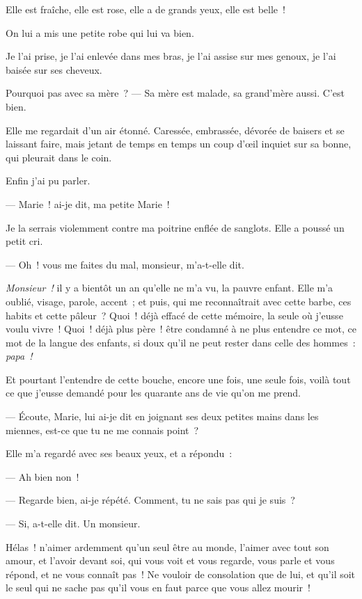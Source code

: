 \documentclass[french,twoside]{book} %
\begin{document}
\noindent Elle est fraîche, elle est rose, elle a de grands yeux, elle est belle !\par
On lui a mis une petite robe qui lui va bien.\par
Je l’ai prise, je l’ai enlevée dans mes bras, je l’ai assise sur mes genoux, je l’ai baisée sur ses cheveux.\par
Pourquoi pas avec sa mère ? — Sa mère est malade, sa grand’mère aussi. C’est bien.\par
Elle me regardait d’un air étonné. Caressée, embrassée, dévorée de baisers et se laissant faire, mais jetant de temps en temps un coup d’œil inquiet sur sa bonne, qui pleurait dans le coin.\par
Enfin j’ai pu parler.\par
— Marie ! ai-je dit, ma petite Marie !\par
Je la serrais violemment contre ma poitrine enflée de sanglots. Elle a poussé un petit cri.\par
— Oh ! vous me faites du mal, monsieur, m’a-t-elle dit.\par
\emph{Monsieur !} il y a bientôt un an qu’elle ne m’a vu, la pauvre enfant. Elle m’a oublié, visage, parole, accent ;  et puis, qui me reconnaîtrait avec cette barbe, ces habits et cette pâleur ? Quoi ! déjà effacé de cette mémoire, la seule où j’eusse voulu vivre ! Quoi ! déjà plus père ! être condamné à ne plus entendre ce mot, ce mot de la langue des enfants, si doux qu’il ne peut rester dans celle des hommes : \emph{papa !}\par
Et pourtant l’entendre de cette bouche, encore une fois, une seule fois, voilà tout ce que j’eusse demandé pour les quarante ans de vie qu’on me prend.\par
— Écoute, Marie, lui ai-je dit en joignant ses deux petites mains dans les miennes, est-ce que tu ne me connais point ?\par
Elle m’a regardé avec ses beaux yeux, et a répondu :\par
— Ah bien non !\par
— Regarde bien, ai-je répété. Comment, tu ne sais pas qui je suis ?\par
— Si, a-t-elle dit. Un monsieur.\par
Hélas ! n’aimer ardemment qu’un seul être au monde, l’aimer avec tout son amour, et l’avoir devant soi, qui vous voit et vous regarde, vous parle et vous répond, et ne vous connaît pas ! Ne vouloir de consolation que de lui, et qu’il soit le seul qui ne sache pas qu’il vous en faut parce que vous allez mourir !\par
\end{document}
